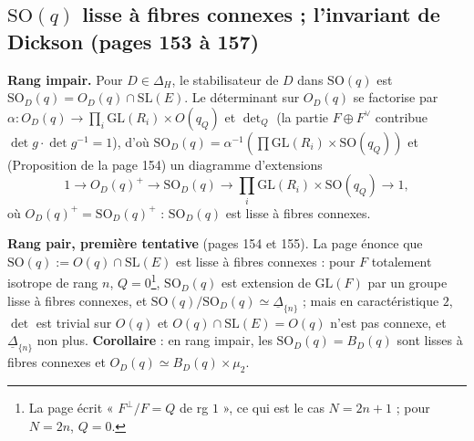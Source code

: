 \documentclass[11pt,a4paper]{article}
\begin{document}
\subsection*{$\mathrm{SO}(q)$ lisse à fibres connexes ; l'invariant de Dickson (pages 153 à 157)}

\textbf{Rang impair.} Pour $D \in \Delta_H$, le stabilisateur de $D$ dans
$\mathrm{SO}(q)$ est $\mathrm{SO}_D(q) = O_D(q) \cap \mathrm{SL}(E)$. Le déterminant sur
$O_D(q)$ se factorise par $\alpha : O_D(q) \to \prod_i \mathrm{GL}(R_i) \times O(q_Q)$ et
$\det_Q$ (la partie $F \oplus F^{\vee}$ contribue $\det g \cdot \det g^{-1} = 1$), d'où
$\mathrm{SO}_D(q) = \alpha^{-1}(\prod \mathrm{GL}(R_i) \times \mathrm{SO}(q_Q))$ et
(Proposition de la page 154) un diagramme d'extensions
\[
  1 \to O_D(q)^{+} \to \mathrm{SO}_D(q) \to \prod_i \mathrm{GL}(R_i) \times
  \mathrm{SO}(q_Q) \to 1 ,
\]
où $O_D(q)^{+} = \mathrm{SO}_D(q)^{+}$ : $\mathrm{SO}_D(q)$ est lisse à fibres connexes.

\textbf{Rang pair, première tentative} (pages 154 et 155). La page énonce que
$\mathrm{SO}(q) := O(q) \cap \mathrm{SL}(E)$ est lisse à fibres connexes : pour $F$
totalement isotrope de rang $n$, $Q = 0$\footnote{La page écrit « $F^{\perp}/F = Q$ de rg
$1$ », ce qui est le cas $N = 2n + 1$ ; pour $N = 2n$, $Q = 0$.}, $\mathrm{SO}_D(q)$ est
extension de $\mathrm{GL}(F)$ par un groupe lisse à fibres connexes, et
$\mathrm{SO}(q)/\mathrm{SO}_D(q) \simeq \underline{\Delta}_{\{n\}}$ ; mais en
caractéristique $2$, $\det$ est trivial sur $O(q)$ et $O(q) \cap \mathrm{SL}(E) = O(q)$
n'est pas connexe, et $\underline{\Delta}_{\{n\}}$ non plus. \textbf{Corollaire} : en
rang impair, les $\mathrm{SO}_D(q) = B_D(q)$ sont lisses à fibres connexes et $O_D(q)
\simeq B_D(q) \times \mu_2$.
\end{document}
